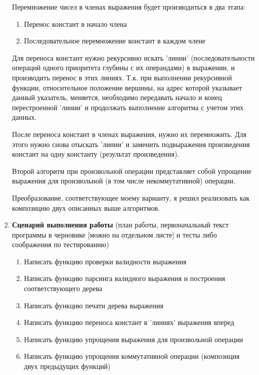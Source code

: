 \documentclass[a4paper]{article}
\newcounter{i}
\newcommand{\Textvii}{
}  %
\begin{document}
\begin{enumerate}[label=\textbf{\arabic*}.]
{Перемножение чисел в членах выражения будет производиться в два этапа:

\begin{enumerate}
    \item Перенос констант в начало члена
    \item Последовательное перемножение констант в каждом члене
\end{enumerate}

Для переноса констант нужно рекурсивно искать 'линии' (последовательности операций одного приоритета глубины с их операндами) в выражении, 
и производить перенос в этих линиях. Т.к. при выполнении рекурсивной функции, относительное положение вершины, на адрес которой указывает данный указатель, меняется,
необходимо передавать начало и конец перестроенной 'линии' и продолжать выполнение алгоритма с учетом этих данных.

После переноса констант в членах выражения, нужно их перемножить. Для этого нужно снова отыскать 'линии' и заменить подвыражения произведения констант на одну константу (результат произведения).

Второй алгоритм при произвольной операции представляет собой упрощение выражения для произвольной (в том числе некоммутативной) операции.

Преобразование, соответствующее моему варианту, я решил реализовать как композицию двух описанных выше алгоритмов.

}

\newpage

\item 
\begin{minipage}[t][0.3\textheight]{.95\textwidth}
\textbf{Сценарий выполнения работы} {\footnotesize (план работы, первоначальный текст программы в черновике [можно на отдельном листе] и тесты либо соображения по тестированию)} \\ \Textvii

\begin{enumerate}
    \item Написать функцию проверки валидности выражения
    \item Написать функцию парсинга валидного выражения и построения соответствующего дерева
    \item Написать функцию печати дерева выражения
    \item Написать функцию переноса констант в 'линиях' выражения вперед
    \item Написать функцию упрощения выражения для произвольной операции
    \item Написать функцию упрощения коммутативной операции (композиция двух предыдущих функций)
\end{enumerate}



\end{minipage}
\end{enumerate}
\end{document}
